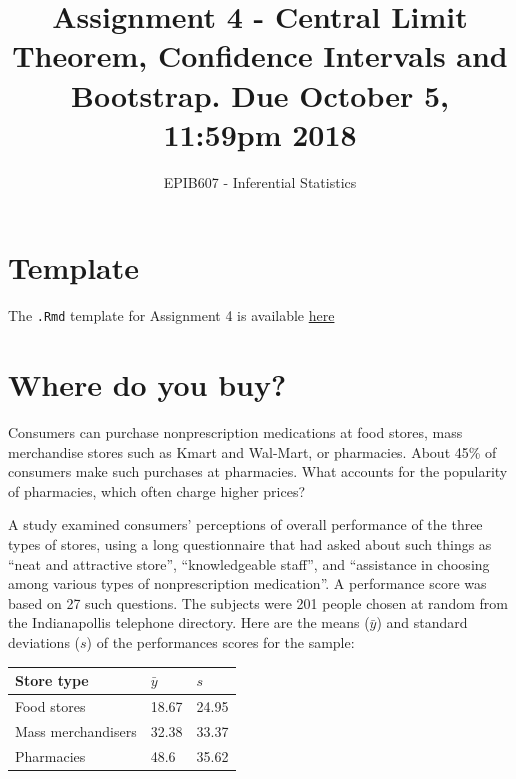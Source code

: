 \documentclass[letterpaper,9pt,twoside,printwatermark=false]{pinp}
\title{Assignment 4 - Central Limit Theorem, Confidence Intervals and
Bootstrap. Due October 5, 11:59pm 2018}
\author[a]{EPIB607 - Inferential Statistics}
\affil[a]{Fall 2018, McGill University}
\begin{document}
\verticaladjustment{-2pt}

\maketitle
\thispagestyle{firststyle}



\section*{Template}\label{template}

The \texttt{.Rmd} template for Assignment 4 is available
\href{https://github.com/sahirbhatnagar/EPIB607/raw/master/assignments/a4/a4_template.Rmd}{here}

\section{Where do you buy?}\label{where-do-you-buy}

Consumers can purchase nonprescription medications at food stores, mass
merchandise stores such as Kmart and Wal-Mart, or pharmacies. About 45\%
of consumers make such purchases at pharmacies. What accounts for the
popularity of pharmacies, which often charge higher prices?

A study examined consumers' perceptions of overall performance of the
three types of stores, using a long questionnaire that had asked about
such things as ``neat and attractive store'', ``knowledgeable staff'',
and ``assistance in choosing among various types of nonprescription
medication''. A performance score was based on 27 such questions. The
subjects were 201 people chosen at random from the Indianapollis
telephone directory. Here are the means (\(\bar{y}\)) and standard
deviations (\(s\)) of the performances scores for the sample:

\begin{longtable}[]{@{}lll@{}}
\toprule
Store type & \(\bar{y}\) & \(s\)\tabularnewline
\midrule
\endhead
Food stores & 18.67 & 24.95\tabularnewline
Mass merchandisers & 32.38 & 33.37\tabularnewline
Pharmacies & 48.6 & 35.62\tabularnewline
\bottomrule
\end{longtable}
\end{document}
